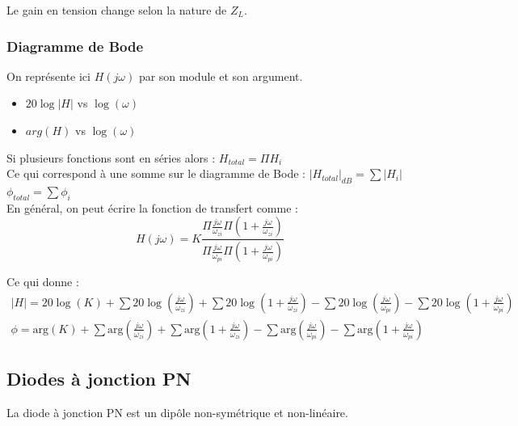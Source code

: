 \documentclass[../main.tex]{subfiles}
\begin{document}
Le gain en tension change selon la nature de $Z_L$.\\

\subsubsection{Diagramme de Bode}
On représente ici $H(j\omega)$ par son module et son argument.\\
\begin{itemize}
    \item $20\log \lvert H \rvert$ vs $\log(\omega)$\\
    \item $arg(H)$ vs $\log(\omega)$\\
\end{itemize}

Si plusieurs fonctions sont en séries alors : $H_{total} = \Pi H_i$\\
Ce qui correspond à une somme sur le diagramme de Bode : $\lvert H_{total}\rvert_{dB} = \sum \lvert H_i\rvert$\\
$\phi_{total}= \sum \phi_i$\\

En général, on peut écrire la fonction de transfert comme : \begin{equation}
    H(j\omega) = K\frac{\Pi \frac{j\omega}{\omega_{zi}} \Pi (1+\frac{j\omega}{\omega_{zi}})}{\Pi \frac{j\omega}{\omega_{pi}} \Pi (1+\frac{j\omega}{\omega_{pi}})}
\end{equation}

Ce qui donne : \begin{equation}
    \begin{gathered}
        \lvert H\rvert = 20\log(K) + \sum 20\log(\frac{j\omega}{\omega_{zi}}) + \sum 20\log(1+\frac{j\omega}{\omega_{zi}}) - \sum 20\log(\frac{j\omega}{\omega_{pi}}) - \sum 20\log(1+\frac{j\omega}{\omega_{pi}})\\
        \phi = \text{arg}(K) +\sum \text{arg}(\frac{j\omega}{\omega_{zi}}) + \sum \text{arg}(1+\frac{j\omega}{\omega_{zi}}) - \sum \text{arg}(\frac{j\omega}{\omega_{pi}}) - \sum \text{arg}(1+\frac{j\omega}{\omega_{pi}})
    \end{gathered}
\end{equation}

\subsection{Diodes à jonction PN}
La diode à jonction PN est un dipôle non-symétrique et non-linéaire.\\
\end{document}
